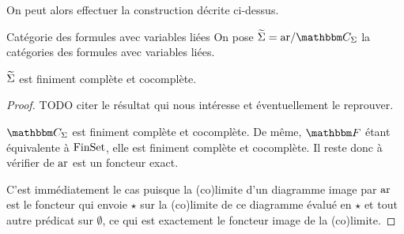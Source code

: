 On peut alors effectuer la construction décrite ci-dessus.

\begin{defi}{Catégorie des formules avec variables liées}
    On pose $\tsigma = \arf/\C_\Sigma$ la catégories des formules avec variables
    liées.
\end{defi}

\begin{prop}
    $\widetilde{\Sigma}$ est finiment complète et cocomplète.
\end{prop}

\begin{proof}
    TODO citer le résultat qui nous intéresse et éventuellement le reprouver.

    $\C_\Sigma$ est finiment complète et cocomplète. De même, $\cf$ étant équivalente
    à $\text{FinSet}$, elle est finiment complète et cocomplète. Il reste donc à vérifier de
    $\text{ar}$ est un foncteur exact.

    C'est immédiatement le cas puisque la (co)limite d'un diagramme image par $\text{ar}$ est
    le foncteur qui envoie $\star$ sur la (co)limite de ce diagramme évalué en $\star$
    et tout autre prédicat sur $\emptyset$, ce qui est exactement le foncteur image
    de la (co)limite.
\end{proof}

